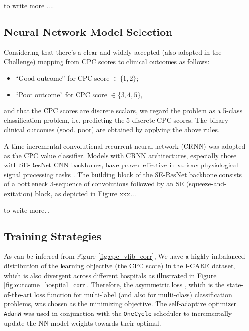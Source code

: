 to write more ....

\subsection{Neural Network Model Selection}
\label{subsec:models}

Considering that there's a clear and widely accepted (also adopted in the Challenge) mapping from CPC scores to clinical outcomes as follows:
\begin{itemize}
    \item ``Good outcome'' for CPC score $\in \{1, 2\};$
    \item ``Poor outcome'' for CPC score $\in \{3, 4, 5\},$
\end{itemize}
and that the CPC scores are discrete scalars, we regard the problem as a 5-class classification problem, i.e. predicting the 5 discrete CPC scores. The binary clinical outcomes (good, poor) are obtained by applying the above rules.

A time-incremental convolutional recurrent neural network (CRNN) \cite{Kang_2022_cinc2021_iop} was adopted as the CPC value classifier. Models with CRNN architectures, especially those with SE-ResNet \cite{hu2020senet} CNN backbones, have proven effective in various physiological signal processing tasks \cite{Kang_2022_cinc2021_iop, wen_cinc2022}. The building block of the SE-ResNet backbone consists of a bottleneck 3-sequence of convolutions followed by an SE (squeeze-and-exitation) block, as depicted in Figure xxx...

to write more...


\subsection{Training Strategies}
\label{subsec:training}

As can be inferred from Figure \ref{fig:cpc_vfib_corr}, We have a highly imbalanced distribution of the learning objective (the CPC score) in the I-CARE dataset, which is also divergent across different hospitals as illustrated in Figure \ref{fig:outcome_hospital_corr}. Therefore, the asymmetric loss \cite{ridnik2021asymmetric_loss}, which is the state-of-the-art loss function for multi-label (and also for multi-class) classification problems, was chosen as the minimizing objective. The self-adaptive optimizer \texttt{AdamW} was used in conjunction with the \texttt{OneCycle} scheduler to incrementally update the NN model weights towards their optimal.

